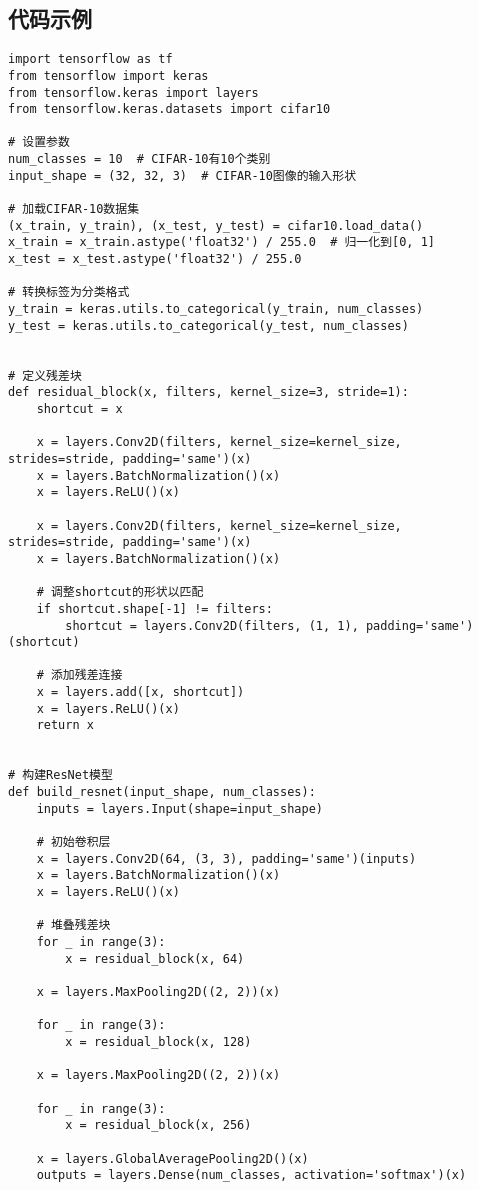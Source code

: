 \subsection*{代码示例}
\begin{lstlisting}
import tensorflow as tf
from tensorflow import keras
from tensorflow.keras import layers
from tensorflow.keras.datasets import cifar10

# 设置参数
num_classes = 10  # CIFAR-10有10个类别
input_shape = (32, 32, 3)  # CIFAR-10图像的输入形状

# 加载CIFAR-10数据集
(x_train, y_train), (x_test, y_test) = cifar10.load_data()
x_train = x_train.astype('float32') / 255.0  # 归一化到[0, 1]
x_test = x_test.astype('float32') / 255.0

# 转换标签为分类格式
y_train = keras.utils.to_categorical(y_train, num_classes)
y_test = keras.utils.to_categorical(y_test, num_classes)


# 定义残差块
def residual_block(x, filters, kernel_size=3, stride=1):
    shortcut = x

    x = layers.Conv2D(filters, kernel_size=kernel_size, strides=stride, padding='same')(x)
    x = layers.BatchNormalization()(x)
    x = layers.ReLU()(x)

    x = layers.Conv2D(filters, kernel_size=kernel_size, strides=stride, padding='same')(x)
    x = layers.BatchNormalization()(x)

    # 调整shortcut的形状以匹配
    if shortcut.shape[-1] != filters:
        shortcut = layers.Conv2D(filters, (1, 1), padding='same')(shortcut)

    # 添加残差连接
    x = layers.add([x, shortcut])
    x = layers.ReLU()(x)
    return x


# 构建ResNet模型
def build_resnet(input_shape, num_classes):
    inputs = layers.Input(shape=input_shape)

    # 初始卷积层
    x = layers.Conv2D(64, (3, 3), padding='same')(inputs)
    x = layers.BatchNormalization()(x)
    x = layers.ReLU()(x)

    # 堆叠残差块
    for _ in range(3):
        x = residual_block(x, 64)

    x = layers.MaxPooling2D((2, 2))(x)

    for _ in range(3):
        x = residual_block(x, 128)

    x = layers.MaxPooling2D((2, 2))(x)

    for _ in range(3):
        x = residual_block(x, 256)

    x = layers.GlobalAveragePooling2D()(x)
    outputs = layers.Dense(num_classes, activation='softmax')(x)


\end{lstlisting}
